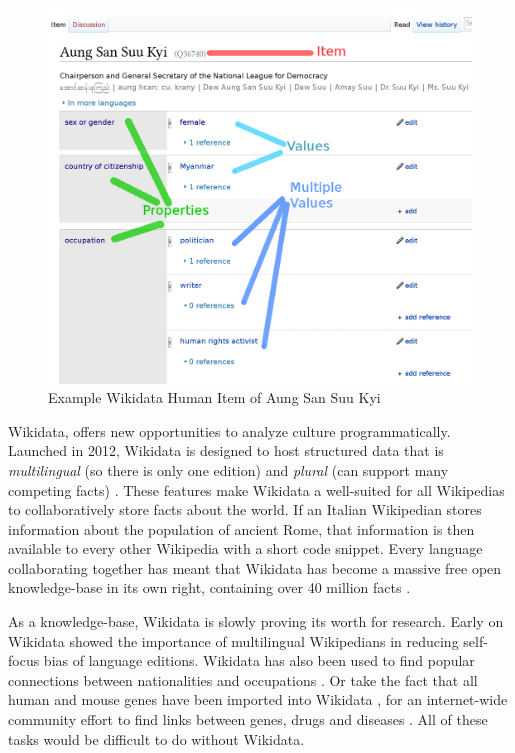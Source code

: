 \documentclass{sig-alternate-05-2015}
\begin{document}
\begin{figure}
\includegraphics[width=\columnwidth]{figures/aung_explainer_small.png} 
\caption{Example Wikidata Human Item of Aung San Suu Kyi}
\label{fig:aung}
\end{figure}

Wikidata, offers new opportunities to analyze culture programmatically. Launched in 2012, Wikidata is designed to host structured data that is \textit{multilingual} (so there is only one edition) and \textit{plural} (can support many competing facts) \cite{vrandecic_wikidata:_2014}.  These features make Wikidata a well-suited for all Wikipedias to collaboratively store facts about the world. If an Italian Wikipedian stores information about the population of ancient Rome, that information is then available to every other Wikipedia with a short code snippet. Every language collaborating together has meant that Wikidata has become a massive free open knowledge-base in its own right, containing over 40 million facts \cite{krotzsch_how_????}.

As a knowledge-base, Wikidata is slowly proving its worth for research. Early on Wikidata showed the importance of multilingual Wikipedians in reducing self-focus bias of language editions. \cite{hale_multilinguals_2014} Wikidata has also been used to find popular connections between nationalities and occupations \cite{goldfarb_quantifying_2015}. Or take the fact that all human and mouse genes have been imported into Wikidata \cite{mitraka_wikidata:_2015}, for an internet-wide community effort to find links between genes, drugs and diseases \cite{burgstaller-muehlbacher_wikidata_2015}. All of these tasks would be difficult to do without Wikidata.
\end{document}
